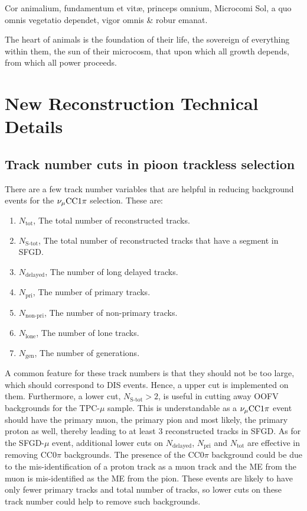  \begin{savequote}[8cm]
\textlatin{Cor animalium, fundamentum e\longs t vitæ, princeps omnium, Microco\longs mi Sol, a quo omnis vegetatio dependet, vigor omnis \& robur emanat.}

The heart of animals is the foundation of their life, the sovereign of everything within them, the sun of their microcosm, that upon which all growth depends, from which all power proceeds.
\end{savequote}

\chapter{\label{app:newtech}New Reconstruction Technical Details}

\minitoc

\section{Track number cuts in pioon trackless selection}
\label{sec:app-tlpi-trknumcut}
There are a few track number variables that are helpful in reducing background events for the $\nu_{\mu}\textrm{CC}1\pi$ selection. 
These are:
\begin{enumerate}
    \item $N_{\textrm{tot}}$, The total number of reconstructed tracks.
    \item $N_{\textrm{S-tot}}$, The total number of reconstructed tracks that have a segment in SFGD.
    \item $N_{\textrm{delayed}}$, The number of long delayed tracks.
    \item $N_{\textrm{pri}}$, The number of primary tracks.
    \item $N_{\textrm{non-pri}}$, The number of non-primary tracks.
    \item $N_{\textrm{lone}}$, The number of lone tracks.
    \item $N_{\textrm{gen}}$, The number of generations.
\end{enumerate}
A common feature for these track numbers is that they should not be too large, which should correspond to DIS events.
Hence, a upper cut is implemented on them.
Furthermore, a lower cut, $N_{\textrm{S-tot}}>2$, is useful in cutting away OOFV backgrounds for the TPC-$\mu$ sample.
This is understandable as a $\nu_{\mu}\textrm{CC}1\pi$ event should have the primary muon, the primary pion and most likely, the primary proton as well, thereby leading to at least $3$ reconstructed tracks in SFGD.
As for the SFGD-$\mu$ event, additional lower cuts on  $N_{\textrm{delayed}}$, $N_{\textrm{pri}}$ and $N_{\textrm{tot}}$ are effective in removing CC$0\pi$ backgrounds.
The presence of the CC$0\pi$ background could be due to the mis-identification of a proton track as a muon track and the ME from the muon is mis-identified as the ME from the pion.
These events are likely to have only fewer primary tracks and total number of tracks, so lower cuts on these track number could help to remove such backgrounds.


